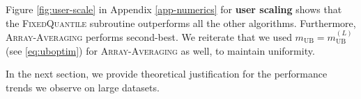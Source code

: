 
Figure \ref{fig:user-scale} in Appendix \ref{app-numerics} for \textbf{user scaling} shows that the \textsc{FixedQuantile} subroutine outperforms all the other algorithms. Furthermore, \textsc{Array-Averaging} performs second-best. We reiterate that we used $m_\text{UB} = m_{\text{UB}}^{(L)}$ (see \eqref{eq:uboptim}) for \textsc{Array-Averaging} as well, to maintain uniformity. 

In the next section, we provide theoretical justification for the performance trends we observe on large datasets.





